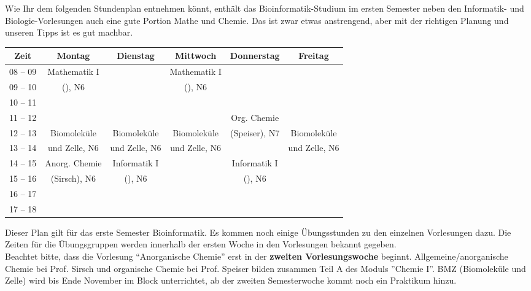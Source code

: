 Wie Ihr dem folgenden Stundenplan entnehmen könnt, enthält das Bioinformatik-Studium im ersten
Semester neben den Informatik- und Biologie-Vorlesungen auch eine gute Portion Mathe und Chemie.
Das ist zwar etwas anstrengend, aber mit der richtigen Planung und unseren Tipps ist es gut
machbar.


\begin{center}
\begin{tabular}{|c|c|c|c|c|c|} \hline
Zeit      & 			Montag 		& Dienstag			& Mittwoch 			& Donnerstag 			& Freitag	 \\
\hline\hline
08 -- 09  & 		Mathematik I 	&  					& Mathematik I 		&  						&			\\
\cline{1-1}\cline{3-3}\cline{5-6}
09 -- 10  & 		(\Matheprof), N6& 					& (\Matheprof), N6  &  						&			\\
\hline
10 -- 11  &							&					&					&						&			\\
\hline
11 -- 12 & 							&  					&					& Org. Chemie 			& 			\\
\cline{1-4}\cline{6-6}
12 -- 13 & 			Biomoleküle		& Biomoleküle   	& Biomoleküle	    & (Speiser), N7			& Biomoleküle \\
\cline{1-1}\cline{5-5}
13 -- 14 & 			und Zelle, N6	& und Zelle, N6		& und Zelle, N6		& 						& und Zelle, N6 \\
\hline
14 -- 15 & 		Anorg. Chemie 		& Informatik I 		& 					& Informatik I 			& 				\\
\cline{1-1}\cline{4-4}\cline{6-6}
15 -- 16 &			 (Sirsch), N6  & (\Infoprof), N6 	& 					& (\Infoprof), N6 		& 				\\
\hline
16 -- 17 & & & & &\\
\hline
17 -- 18 & & & & & \\
\hline
\end{tabular}
\end{center}

Dieser Plan gilt für das erste Semester Bioinformatik. Es kommen noch einige Übungsstunden
zu den einzelnen Vorlesungen dazu. Die Zeiten für die Übungsgruppen werden innerhalb der ersten Woche in den Vorlesungen bekannt gegeben.\\
Beachtet bitte, dass die Vorlesung "`Anorganische Chemie"' erst in der \textbf{zweiten Vorlesungswoche} beginnt.
Allgemeine/anorganische Chemie bei Prof. Sirsch und organische Chemie bei Prof. Speiser bilden zusammen Teil A des Moduls ''Chemie I''.
BMZ (Biomoleküle und Zelle) wird bis Ende November im Block unterrichtet, ab der zweiten Semesterwoche kommt noch ein Praktikum hinzu.

